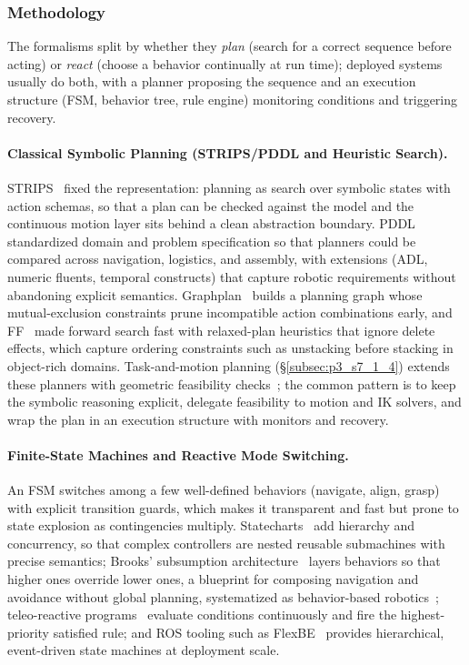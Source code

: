 \subsubsection{Methodology}
The formalisms split by whether they \emph{plan} (search for a correct sequence before acting) or \emph{react} (choose a behavior continually at run time); deployed systems usually do both, with a planner proposing the sequence and an execution structure (FSM, behavior tree, rule engine) monitoring conditions and triggering recovery.

\paragraph{Classical Symbolic Planning (STRIPS/PDDL and Heuristic Search).}
STRIPS~\cite{Fikes1971STRIPS} fixed the representation: planning as search over symbolic states with action schemas, so that a plan can be checked against the model and the continuous motion layer sits behind a clean abstraction boundary. PDDL~\cite{McDermott1998PDDL} standardized domain and problem specification so that planners could be compared across navigation, logistics, and assembly, with extensions (ADL, numeric fluents, temporal constructs) that capture robotic requirements without abandoning explicit semantics. Graphplan~\cite{Blum1997PlanningGraph} builds a planning graph whose mutual-exclusion constraints prune incompatible action combinations early, and FF~\cite{Hoffmann2001FF} made forward search fast with relaxed-plan heuristics that ignore delete effects, which capture ordering constraints such as unstacking before stacking in object-rich domains. Task-and-motion planning (§\ref{subsec:p3_s7_1_4}) extends these planners with geometric feasibility checks~\cite{Kaelbling2011HierarchicalNow,Garrett2021TAMPReview,Zhao2024TAMPsurvey}; the common pattern is to keep the symbolic reasoning explicit, delegate feasibility to motion and IK solvers, and wrap the plan in an execution structure with monitors and recovery.

\paragraph{Finite-State Machines and Reactive Mode Switching.}
An FSM switches among a few well-defined behaviors (navigate, align, grasp) with explicit transition guards, which makes it transparent and fast but prone to state explosion as contingencies multiply. Statecharts~\cite{Harel1987Statecharts} add hierarchy and concurrency, so that complex controllers are nested reusable submachines with precise semantics; Brooks' subsumption architecture~\cite{Brooks1986Subsumption} layers behaviors so that higher ones override lower ones, a blueprint for composing navigation and avoidance without global planning, systematized as behavior-based robotics~\cite{Arkin1998BehaviorBased}; teleo-reactive programs~\cite{Nilsson1994TeleoReactive} evaluate conditions continuously and fire the highest-priority satisfied rule; and ROS tooling such as FlexBE~\cite{conner2023flexbe} provides hierarchical, event-driven state machines at deployment scale.


